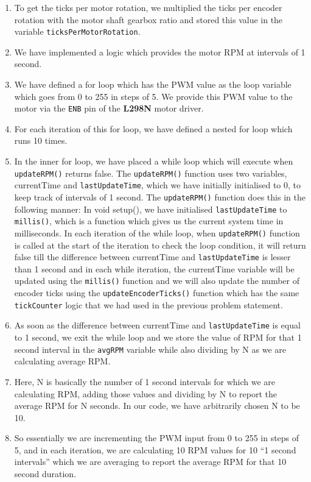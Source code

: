 \documentclass[12pt]{article}
\begin{document}
\begin{enumerate}
    \item To get the ticks per motor rotation, we multiplied the ticks per encoder rotation with the motor shaft gearbox ratio and stored this value in the variable \texttt{ticksPerMotorRotation}.
    \item We have implemented a logic which provides the motor RPM at intervals of 1 second.
    \item We have defined a for loop which has the PWM value as the loop variable which goes from 0 to 255 in steps of 5. We provide this PWM value to the motor via the \texttt{ENB} pin of the \textbf{L298N} motor driver.
    \item For each iteration of this for loop, we have defined a nested for loop which runs 10 times.
    \item In the inner for loop, we have placed a while loop which will execute when \texttt{updateRPM()} returns false. The \texttt{updateRPM()} function uses two variables, currentTime and \texttt{lastUpdateTime}, which we have initially initialised to 0, to keep track of intervals of 1 second. The \texttt{updateRPM()} function does this in the following manner: In void setup(), we have initialised \texttt{lastUpdateTime} to \texttt{millis()}, which is a function which gives us the current system time in milliseconds. In each iteration of the while loop, when \texttt{updateRPM()} function is called at the start of the iteration to check the loop condition, it will return false till the difference between currentTime and \texttt{lastUpdateTime} is lesser than 1 second and in each while iteration, the currentTime variable will be updated using the \texttt{millis()} function and we will also update the number of encoder ticks using the \texttt{updateEncoderTicks()} function which has the same \texttt{tickCounter} logic that we had used in the previous problem statement.
    \item As soon as the difference between currentTime and \texttt{lastUpdateTime} is equal to 1 second, we exit the while loop and we store the value of RPM for that 1 second interval in the \texttt{avgRPM} variable while also dividing by N as we are calculating average RPM.
    \item Here, N is basically the number of 1 second intervals for which we are calculating RPM, adding those values and dividing by N to report the average RPM for N seconds. In our code, we have arbitrarily chosen N to be 10.
    \item So essentially we are incrementing the PWM input from 0 to 255 in steps of 5, and in each iteration, we are calculating 10 RPM values for 10 “1 second intervals” which we are averaging to report the average RPM for that 10 second duration.

\end{enumerate}
\end{document}
